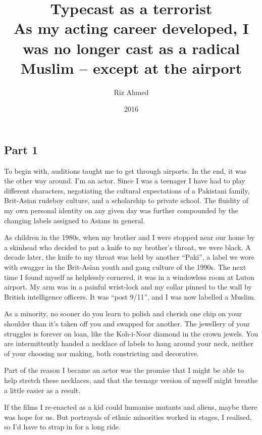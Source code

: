 \documentclass[10pt,a4paper]{article}
\begin{document}
\title{Typecast as a terrorist\\\normalsize As my acting career developed, I was no longer cast as a radical Muslim – except at the airport}
\date{2016}
\author{Riz Ahmed}

\maketitle
\subsection{Part 1}
\noindent\linenumbers To begin with, auditions taught me to get through airports. In the end, it was the other way around. I’m an actor. Since I was a teenager I have had to play different characters, negotiating the cultural expectations of a Pakistani family, Brit-Asian rudeboy culture, and a scholarship to private school. The fluidity of my own personal identity on any given day was further compounded by the changing labels assigned to Asians in general.

As children in the 1980s, when my brother and I were stopped near our home by a skinhead who decided to put a knife to my brother’s throat, we were black. A decade later, the knife to my throat was held by another “Paki”, a label we wore with swagger in the Brit-Asian youth and gang culture of the 1990s. The next time I found myself as helplessly cornered, it was in a windowless room at Luton airport. My arm was in a painful wrist-lock and my collar pinned to the wall by British intelligence officers. It was “post 9/11”, and I was now labelled a Muslim.

As a minority, no sooner do you learn to polish and cherish one chip on your shoulder than it’s taken off you and swapped for another. The jewellery of your struggles is forever on loan, like the Koh-i-Noor diamond in the crown jewels. You are intermittently handed a necklace of labels to hang around your neck, neither of your choosing nor making, both constricting and decorative.

Part of the reason I became an actor was the promise that I might be able to help stretch these necklaces, and that the teenage version of myself might breathe a little easier as a result.

If the films I re-enacted as a kid could humanise mutants and aliens, maybe there was hope for us. But portrayals of ethnic minorities worked in stages, I realised, so I’d have to strap in for a long ride.
\end{document}
